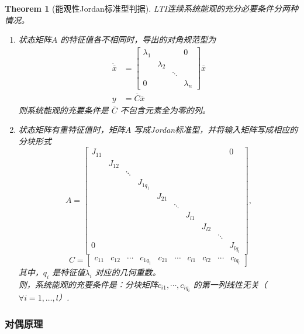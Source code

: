 \documentclass[14pt,a4paper]{article}
\theoremstyle{plain}
\newtheorem{thm}{Theorem}[section]
\theoremstyle{definition}
\theoremstyle{remark}
\theoremstyle{plain}
\theoremstyle{plain}
\theoremstyle{plain}
\theoremstyle{definition}
\theoremstyle{remark}
\numberwithin{equation}{section}
\begin{document}
				\begin{thm}[能观性Jordan标准型判据]  
				\label{the:能观性jordan标准型判据}
					LTI连续系统能观的\emph{充分必要}条件分两种情况。
					\begin{enumerate}[(1)]
						\item 状态矩阵$A$ 的特征值各不相同时，导出的对角规范型为
							\[
								\begin{split}
									\dot{ \overline{x}} &= \begin{bmatrix}
								\lambda_1 & & & 0\\
										  & \lambda_2 & &\\
								&&\ddots &\\
								0 &&& \lambda_{n}
								\end{bmatrix} \overline{x} \\ 
										y &= \overline{C} \overline{x}
								\end{split}
							\]
							则系统能观的充要条件是 $\overline{C}$ 不包含元素全为零的列。
						\item 状态矩阵有重特征值时，矩阵$A$ 写成Jordan标准型，并将输入矩阵写成相应的分块形式
							\[
							A = \begin{bmatrix}
								J_{11} &&&&&&&&&0 \\
									   & J_{12} &&&&&&&&\\
									   &&\ddots &&&&&&&\\
									   &&&J_{1 q_1} &&&&&&\\
									   &&&&J_{21}&&&&&\\
									   &&&&&\ddots &&&&\\
									   &&&&&&J_{l 1}&&&\\
									   &&&&&&&J_{l 2}&&\\
									   &&&&&&&&\ddots & \\
										0&&&&&&&&&J_{l q_l}
							\end{bmatrix} 
							,\] 
							\[
								C = \begin{bmatrix}
									c_{11} & c_{12} & \cdots  & c_{1 q_1} & c_{21} & \cdots & c_{l 1} & c_{l 2} & \cdots  & c_{l q_l} 
								\end{bmatrix} 
							\]
							其中，$q_{i}$ 是特征值$\lambda_{i}$ 对应的几何重数。\\
							则，系统能观的充要条件是：分块矩阵$c_{i 1}, \cdots ,c_{iq_{i}}$ 的第一列线性无关（$\forall i=1,\ldots ,l$）. 
					\end{enumerate}
				\end{thm} 
			\subsubsection{对偶原理}%
			\label{ssub:对偶原理} 
\end{document}
